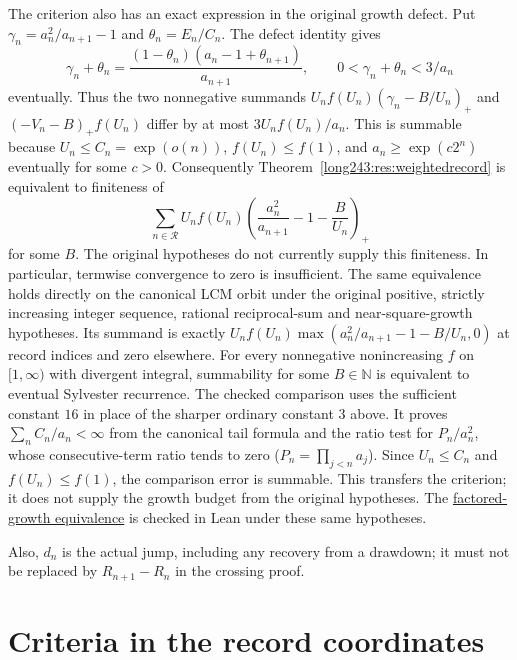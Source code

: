 The criterion also has an exact expression in the original growth defect.
Put $\gamma_n=a_n^2/a_{n+1}-1$ and $\theta_n=E_n/C_n$. The defect identity
gives
\[
 \gamma_n+\theta_n=
 \frac{(1-\theta_n)(a_n-1+\theta_{n+1})}{a_{n+1}},
 \qquad 0<\gamma_n+\theta_n<3/a_n
\]
eventually. Thus the two nonnegative summands
$U_nf(U_n)(\gamma_n-B/U_n)_+$ and $(-V_n-B)_+f(U_n)$ differ by at most
$3U_nf(U_n)/a_n$. This is summable because
$U_n\le C_n=\exp(o(n))$, $f(U_n)\le f(1)$, and
$a_n\ge\exp(c2^n)$ eventually for some $c>0$.
Consequently Theorem~\ref{long243:res:weightedrecord} is equivalent to finiteness of
\begin{equation}\label{long243:eq:weightedgrowth}
 \sum_{n\in\mathcal R}U_nf(U_n)
 \left(\frac{a_n^2}{a_{n+1}}-1-\frac B{U_n}\right)_+
\end{equation}
for some $B$. The original hypotheses do not currently supply this
finiteness. In particular, termwise convergence to zero is insufficient.
The same equivalence holds directly on the canonical LCM orbit under the
original positive, strictly increasing integer sequence, rational reciprocal-sum
and near-square-growth hypotheses.  Its summand is exactly
$U_nf(U_n)\max(a_n^2/a_{n+1}-1-B/U_n,0)$ at record indices and zero elsewhere.
For every nonnegative nonincreasing $f$ on $[1,\infty)$
with divergent integral, summability for some $B\in\mathbb N$ is equivalent to eventual Sylvester
recurrence.  The checked comparison uses the sufficient constant $16$ in
place of the sharper ordinary constant $3$ above.  It proves
$\sum_n C_n/a_n<\infty$ from the canonical tail formula and the ratio test
for $P_n/a_n^2$, whose consecutive-term ratio tends to zero
($P_n=\prod_{j<n}a_j$).  Since $U_n\le C_n$ and $f(U_n)\le f(1)$,
the comparison error is summable.  This transfers the criterion; it does
not supply the growth budget from the original hypotheses.
The \href{https://github.com/wcook04/plectis-erdos/blob/d4fed71423840f70f10edf27b9ad27c22fc4f49a/ErdosProblems/Erdos243/PaperCompleteR8/GrowthDebtSummability.lean#L234}{factored-growth equivalence}
is checked in Lean under these same hypotheses.

Also, $d_n$ is the actual jump, including any recovery from a drawdown; it
must not be replaced by $R_{n+1}-R_n$ in the crossing proof.


\section{Criteria in the record coordinates}\label{long243:sec:records}


